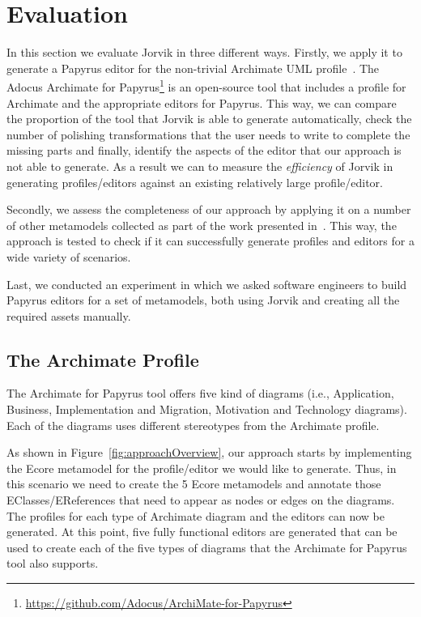 \section{Evaluation}
\label{sec:evaluation}

In this section we evaluate Jorvik in three different ways. 
Firstly, we apply it to generate a Papyrus editor for the non-trivial Archimate UML profile~\cite{iacob2009archimate,haren2012archimate}. 
The Adocus Archimate for Papyrus\footnote{\url{https://github.com/Adocus/ArchiMate-for-Papyrus}} is an open-source tool that includes a profile for Archimate and the appropriate 
editors for Papyrus. 
This way, we can compare the proportion of the tool that Jorvik is able to generate automatically, check the number of polishing transformations that the user needs to write to complete the missing parts and finally, identify the aspects of the editor that our approach is not able to generate.
As a result we can to measure the \textit{efficiency} of Jorvik in generating profiles/editors against an existing relatively large profile/editor. 

Secondly, we assess the completeness of our approach by applying it on a number of other metamodels collected as part of the work presented in~\cite{williams2013metamodels}. 
This way, the approach is tested to check if it can successfully generate profiles and editors for a wide variety of scenarios.

Last, we conducted an experiment in which we asked software engineers to build Papyrus editors for a set of metamodels, both using Jorvik and creating all the required assets manually.

\subsection{The Archimate Profile}
\label{sec:efficiencyEvaluation}
The Archimate for Papyrus tool offers five kind of diagrams (i.e., Application, Business, Implementation and Migration, Motivation and Technology diagrams). 
Each of the diagrams uses different stereotypes from the Archimate profile. 

As shown in Figure~\ref{fig:approachOverview}, our approach starts by implementing the Ecore metamodel for the profile/editor we would like to generate. 
Thus, in this scenario we need to create the 5 Ecore metamodels and annotate those EClasses/EReferences that need to appear as nodes or edges on the diagrams. 
The profiles for each type of Archimate diagram and the editors can now be generated. 
At this point, five fully functional editors are generated that can be used to create each of the five types of diagrams that the Archimate for Papyrus tool also supports. 

